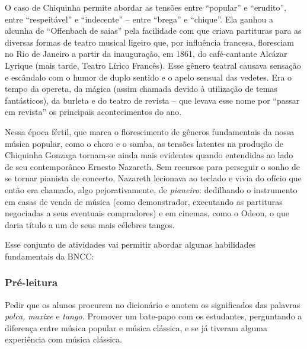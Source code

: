 \documentclass[11pt]{extarticle}
\begin{document}
O caso de Chiquinha permite abordar as tensões entre ``popular'' e
``erudito'', entre ``respeitável'' e ``indecente'' -- entre ``brega'' e
``chique''. Ela ganhou a alcunha de ``Offenbach de saias'' pela
facilidade com que criava partituras para as diversas formas de teatro
musical ligeiro que, por influência francesa, floresciam no Rio de
Janeiro a partir da inauguração, em 1861, do café-cantante Alcázar
Lyrique (mais tarde, Teatro Lírico Francês). Esse gênero teatral causava
sensação e escândalo com o humor de duplo sentido e o apelo sensual das
vedetes. Era o tempo da opereta, da mágica (assim chamada devido à
utilização de temas fantásticos), da burleta e do teatro de revista --
que levava esse nome por ``passar em revista'' os principais
acontecimentos do ano.

Nessa época fértil, que marca o florescimento de gêneros fundamentais da
nossa música popular, como o choro e o samba, as tensões latentes na
produção de Chiquinha Gonzaga tornam-se ainda mais evidentes quando
entendidas ao lado de seu contemporâneo Ernesto Nazareth. Sem recursos
para perseguir o sonho de se tornar pianista de concerto, Nazareth
lecionava ao teclado e vivia do ofício que então era chamado, algo
pejorativamente, de \emph{pianeiro}: dedilhando o instrumento em casas
de venda de música (como demonstrador, executando as partituras
negociadas a seus eventuais compradores) e em cinemas, como o Odeon, o
que daria título a um de seus mais célebres tangos.

Esse conjunto de atividades vai permitir abordar algunas habilidades fundamentais da BNCC:





\subsubsection{Pré-leitura}

Pedir que os alunos procurem no dicionário e anotem os significados das
palavras \emph{polca, maxixe} e \emph{tango.} Promover um bate-papo com
os estudantes, perguntando a diferença entre música popular e música
clássica, e se já tiveram alguma experiência com música clássica.
\end{document}
